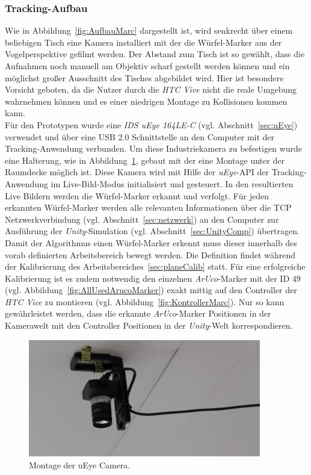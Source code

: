\subsubsection{Tracking-Aufbau}%
Wie in Abbildung~\ref{fig:AufbauMarc} dargestellt ist, wird senkrecht über einem beliebigen Tisch eine Kamera installiert mit der die Würfel-Marker aus der Vogelperspektive gefilmt werden. Der Abstand zum Tisch ist so gewählt, dass die Aufnahmen noch manuell am Objektiv scharf gestellt werden können und ein möglichst großer Ausschnitt des Tisches abgebildet wird. Hier ist besondere Vorsicht geboten, da die Nutzer durch die \textit{HTC Vive} nicht die reale Umgebung wahrnehmen können und es einer niedrigen Montage zu Kollisionen kommen kann.\\
Für den Prototypen wurde eine \textit{IDS uEye 164LE-C} (vgl. Abschnitt~\ref{sec:uEye}) verwendet und über eine USB 2.0 Schnittstelle an den Computer mit der Tracking-Anwendung verbunden. Um diese Industriekamera zu befestigen wurde eine Halterung, wie in Abbildung~\ref{fig:uEyeMontage}, gebaut mit der eine Montage unter der Raumdecke möglich ist. Diese Kamera wird mit Hilfe der \textit{uEye}-API der Tracking-Anwendung im Live-Bild-Modus initialisiert und gesteuert. In den resultierten Live Bildern werden die Würfel-Marker erkannt und verfolgt. Für jeden erkannten Würfel-Marker werden alle relevanten Informationen über die TCP Netzwerkverbindung (vgl. Abschnitt~\ref{sec:netzwerk}) an den Computer zur Ausführung der \textit{Unity}-Simulation (vgl. Abschnitt~\ref{sec:UnityComp}) übertragen. Damit der Algorithmus einen Würfel-Marker erkennt muss dieser innerhalb des vorab definierten Arbeitsbereich bewegt werden. Die Definition findet während der Kalibrierung des Arbeitsbereiches~\ref{sec:planeCalib} statt. Für eine erfolgreiche Kalibrierung ist es zudem notwendig den einzelnen \textit{ArUco}-Marker mit der ID $49$ (vgl. Abbildung~\ref{fig:AllUsedArucoMarker}) exakt mittig auf den Controller der \textit{HTC Vice} zu montieren (vgl. Abbildung~\ref{fig:KontrollerMarc}). Nur so kann gewährleistet werden, dass die erkannte \textit{ArUco}-Marker Positionen in der Kamerawelt mit den Controller Positionen in der \textit{Unity}-Welt korrespondieren.

\begin{figure}[H]
	\centering
	\includegraphics[width=4in]{Bilder/Eigene Fotos/IMG_0020.jpg}			
	\caption[Montage der uEye Camera]{Montage der uEye Camera.}
	\label{fig:uEyeMontage}
\end{figure}

